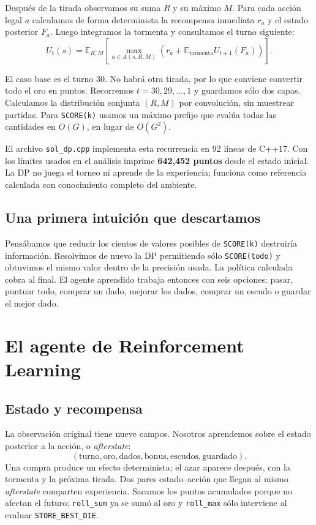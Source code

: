 \documentclass[10pt,a4paper]{article}
\begin{document}
Después de la tirada observamos su suma $R$ y su máximo $M$. Para cada acción legal $a$ calculamos de forma determinista la recompensa inmediata $r_a$ y el estado posterior $F_a$. Luego integramos la tormenta y consultamos el turno siguiente:
\[
U_t(s)=\mathbb{E}_{R,M}\!\left[
\max_{a\in A(s,R,M)}\left(r_a+
\mathbb{E}_{\text{tormenta}}U_{t+1}(F_a)\right)\right].
\]

El caso base es el turno 30. No habrá otra tirada, por lo que conviene convertir todo el oro en puntos. Recorremos $t=30,29,\ldots,1$ y guardamos sólo dos capas. Calculamos la distribución conjunta $(R,M)$ por convolución, sin muestrear partidas. Para \texttt{SCORE(k)} usamos un máximo prefijo que evalúa todas las cantidades en $O(G)$, en lugar de $O(G^2)$.

El archivo \texttt{sol\_dp.cpp} implementa esta recurrencia en 92 líneas de C++17. Con los límites usados en el análisis imprime \textbf{642,452 puntos} desde el estado inicial. La DP no juega el torneo ni aprende de la experiencia; funciona como referencia calculada con conocimiento completo del ambiente.

\subsection{Una primera intuición que descartamos}

Pensábamos que reducir los cientos de valores posibles de \texttt{SCORE(k)} destruiría información. Resolvimos de nuevo la DP permitiendo sólo \texttt{SCORE(todo)} y obtuvimos el mismo valor dentro de la precisión usada. La política calculada cobra al final. El agente aprendido trabaja entonces con seis opciones: pasar, puntuar todo, comprar un dado, mejorar los dados, comprar un escudo o guardar el mejor dado.

\newpage
\section{El agente de Reinforcement Learning}

\subsection{Estado y recompensa}

La observación original tiene nueve campos. Nosotros aprendemos sobre el estado posterior a la acción, o \emph{afterstate}:
\[
(\text{turno},\text{oro},\text{dados},\text{bonus},\text{escudos},\text{guardado}).
\]
Una compra produce un efecto determinista; el azar aparece después, con la tormenta y la próxima tirada. Dos pares estado--acción que llegan al mismo \emph{afterstate} comparten experiencia. Sacamos los puntos acumulados porque no afectan el futuro; \texttt{roll\_sum} ya se sumó al oro y \texttt{roll\_max} sólo interviene al evaluar \texttt{STORE\_BEST\_DIE}.
\end{document}
